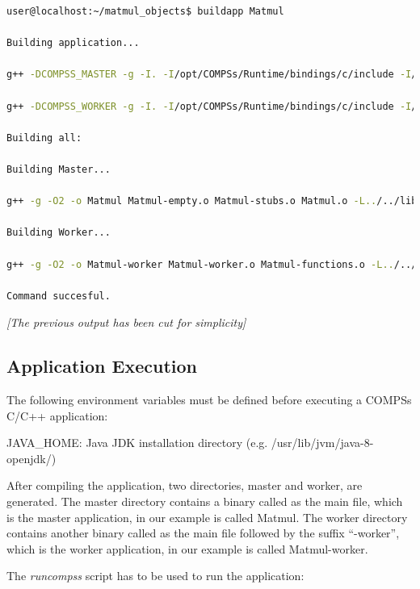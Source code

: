 \begin{lstlisting}[language=bash]
user@localhost:~/matmul_objects$ buildapp Matmul

Building application...

g++ -DCOMPSS_MASTER -g -I. -I/opt/COMPSs/Runtime/bindings/c/include -I/opt/COMPSs/Runtime/bindings/bindings-common/include -c Block.cc Matrix.cc ar rvs libmaster.a Block.o Matrix.o

g++ -DCOMPSS_WORKER -g -I. -I/opt/COMPSs/Runtime/bindings/c/include -I/opt/COMPSs/Runtime/bindings/bindings-common/include -c Block.cc Matrix.cc ar rvs libworker.a Block.o Matrix.o

Building all:

Building Master...

g++ -g -O2 -o Matmul Matmul-empty.o Matmul-stubs.o Matmul.o -L../../lib -lmaster -L/usr/lib/jvm/java-6-openjdk-amd64/jre/lib/amd64/server -ljvm -ldl -L/opt/COMPSs/Runtime/bindings/c/../bindings-common/lib -lbindings_common -L/opt/COMPSs/Runtime/bindings/c/lib -lcbindings -lboost_iostreams -lboost_serialization

Building Worker...

g++ -g -O2 -o Matmul-worker Matmul-worker.o Matmul-functions.o -L../../lib -lworker -ldl -lboost_iostreams -lboost_serialization -L/opt/COMPSs/Runtime/bindings/c/lib

Command succesful.
\end{lstlisting}

\emph{[The previous output has been cut for simplicity]}


\subsection{Application Execution}

The following environment variables must be defined before executing a COMPSs C/C++ application:
            
JAVA\_HOME: Java JDK installation directory (e.g. /usr/lib/jvm/java-8-openjdk/)

After compiling the application, two directories, master and worker, are generated. 
The master directory contains a binary called as the main file, which is the master application, in our 
example is called Matmul. The worker directory contains another binary called as the main file followed 
by the suffix ``-worker'', which is the worker application, in our example is called Matmul-worker.

The \textit{runcompss} script has to be used to run the application:

